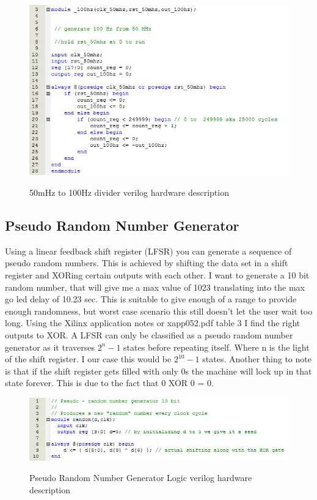 \documentclass[paper=a4, fontsize=11pt]{scrartcl}
\numberwithin{equation}{section}		%
\numberwithin{figure}{section}			%
\numberwithin{table}{section}				%
\begin{document}
\begin{center}
\begin{figure}[h!]
\centering
\caption{50mHz to 100Hz divider verilog hardware description }
\includegraphics[scale=0.7]{divider}
\label{fig:div}
\end{figure}




\subsection{Pseudo Random Number Generator}

Using a linear feedback shift register (LFSR) you can generate a sequence of pseudo random numbers. This is achieved by shifting the data set in a shift register and XORing certain outputs with each other. I want to generate a 10 bit  random number, that will give me a max value of 1023 translating into the max go led delay of 10.23 sec. This is suitable to give enough of a range to provide enough randomness, but worst case scenario this still doesn't let the user wait too long. Using the Xilinx application notes or xapp052.pdf table 3 I find the right outputs to XOR. A LFSR can only be classified as a pseudo random number generator as it traverses $2^n-1$ states before repeating itself. Where n is the light of the shift register. I our case this would be $2^{10}-1$ states. Another thing to note is that if the shift register gets filled with only 0s the machine will lock up in that state forever. This is due to the fact that 0 XOR 0 = 0. 







\begin{figure}[h!]
\centering
\caption{Pseudo Random Number Generator Logic verilog hardware description}
\includegraphics[scale=0.7]{ran}
\label{fig:ran}
\end{figure}



\end{center}
\end{document}
